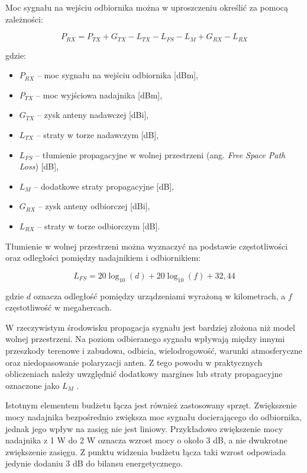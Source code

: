 \documentclass[12pt,a4paper,twoside]{report}
\theoremstyle{definition} %
\begin{document}
Moc sygnału na wejściu odbiornika można w uproszczeniu określić za pomocą zależności:

	\begin{equation}\label{linkbudget}
        P_{RX} = P_{TX} + G_{TX} - L_{TX} - L_{FS} - L_M + G_{RX} - L_{RX}
    \end{equation}

gdzie:

\begin{itemize}
\item \(P_{RX}\) -- moc sygnału na wejściu odbiornika [dBm],
\item \(P_{TX}\) -- moc wyjściowa nadajnika [dBm],
\item \(G_{TX}\) -- zysk anteny nadawczej [dBi],
\item \(L_{TX}\) -- straty w torze nadawczym [dB],
\item \(L_{FS}\) -- tłumienie propagacyjne w wolnej przestrzeni (ang. \textit{Free Space Path Loss}) [dB],
\item \(L_M\) -- dodatkowe straty propagacyjne [dB],
\item \(G_{RX}\) -- zysk anteny odbiorczej [dBi],
\item \(L_{RX}\) -- straty w torze odbiorczym [dB].
\end{itemize}

Tłumienie w wolnej przestrzeni można wyznaczyć na podstawie częstotliwości oraz odległości pomiędzy nadajnikiem i odbiornikiem:

	\begin{equation}\label{L_FS}
        L_{FS} = 20\log_{10}(d) + 20\log_{10}(f) + 32{,}44
    \end{equation}

gdzie \(d\) oznacza odległość pomiędzy urządzeniami wyrażoną w kilometrach, a \(f\) częstotliwość w megahercach.

W rzeczywistym środowisku propagacja sygnału jest bardziej złożona niż model wolnej przestrzeni. Na poziom odbieranego sygnału wpływają między innymi przeszkody terenowe i zabudowa, odbicia, wielodrogowość, warunki atmosferyczne oraz niedopasowanie polaryzacji anten. Z tego powodu w praktycznych obliczeniach należy uwzględnić dodatkowy margines lub straty propagacyjne oznaczone jako \(L_M\) \cite{rappaport2002}.

Istotnym elementem budżetu łącza jest również zastosowany sprzęt. Zwiększenie mocy nadajnika bezpośrednio zwiększa moc sygnału docierającego do odbiornika, jednak jego wpływ na zasięg nie jest liniowy. Przykładowo zwiększenie mocy nadajnika z 1 W do 2 W oznacza wzrost mocy o około 3 dB, a nie dwukrotne zwiększenie zasięgu. Z punktu widzenia budżetu łącza taki wzrost odpowiada jedynie dodaniu 3 dB do bilansu energetycznego.
\end{document}
